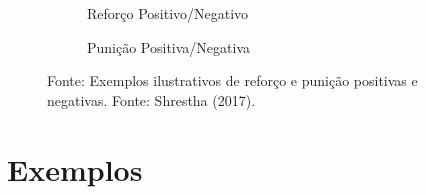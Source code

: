 \documentclass{article}
\begin{document}
                \begin{figure}[ht]
                    \centering
                    \begin{subfigure}[b]{.45\textwidth}
                        \centering
                        \caption{Reforço Positivo/Negativo}
                    \end{subfigure}
                    \begin{subfigure}[b]{.45\textwidth}
                        \centering
                        \caption{Punição Positiva/Negativa}
                    \end{subfigure}
                    \caption{Fonte: Exemplos ilustrativos de reforço e punição positivas e negativas. Fonte: Shrestha (2017).}
                    \label{fig:reforco-punicao}
                \end{figure}
            
    \section{Exemplos}
    
\end{document}
